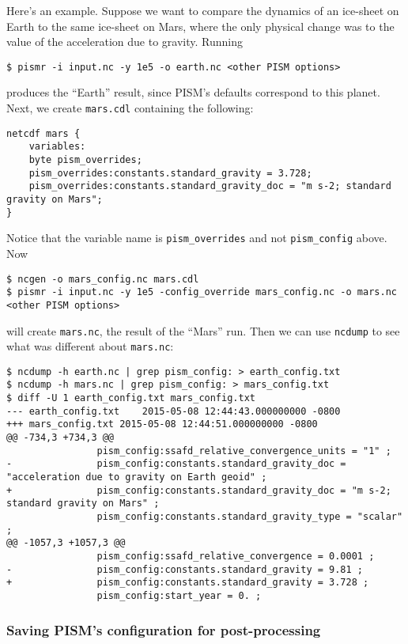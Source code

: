 Here's an example.  Suppose we want to compare the dynamics of an ice-sheet on Earth to the same ice-sheet on Mars, where the only physical change was to the value of the acceleration due to gravity.  Running
\begin{verbatim}
$ pismr -i input.nc -y 1e5 -o earth.nc <other PISM options>
\end{verbatim}
produces the ``Earth'' result, since PISM's defaults correspond to this planet.  Next, we create \texttt{mars.cdl} containing the following:
\small
\begin{verbatim}
netcdf mars {
    variables:
    byte pism_overrides;
    pism_overrides:constants.standard_gravity = 3.728;
    pism_overrides:constants.standard_gravity_doc = "m s-2; standard gravity on Mars";
}
\end{verbatim}
\normalsize
Notice that the variable name is \texttt{pism_overrides} and not \texttt{pism_config} above. Now
\small
\begin{verbatim}
$ ncgen -o mars_config.nc mars.cdl
$ pismr -i input.nc -y 1e5 -config_override mars_config.nc -o mars.nc <other PISM options>
\end{verbatim}
\normalsize
will create \texttt{mars.nc}, the result of the ``Mars'' run.  Then we can use \texttt{ncdump} to see what was different about \texttt{mars.nc}:
\small
\begin{verbatim}
$ ncdump -h earth.nc | grep pism_config: > earth_config.txt
$ ncdump -h mars.nc | grep pism_config: > mars_config.txt
$ diff -U 1 earth_config.txt mars_config.txt
--- earth_config.txt	2015-05-08 12:44:43.000000000 -0800
+++ mars_config.txt	2015-05-08 12:44:51.000000000 -0800
@@ -734,3 +734,3 @@
                pism_config:ssafd_relative_convergence_units = "1" ;
-               pism_config:constants.standard_gravity_doc = "acceleration due to gravity on Earth geoid" ;
+               pism_config:constants.standard_gravity_doc = "m s-2; standard gravity on Mars" ;
                pism_config:constants.standard_gravity_type = "scalar" ;
@@ -1057,3 +1057,3 @@
                pism_config:ssafd_relative_convergence = 0.0001 ;
-               pism_config:constants.standard_gravity = 9.81 ;
+               pism_config:constants.standard_gravity = 3.728 ;
                pism_config:start_year = 0. ;
\end{verbatim}
\normalsize

\subsubsection*{Saving PISM's configuration for post-processing}
\label{sec:saving-pism-config}

